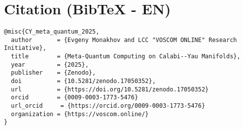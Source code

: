 \documentclass[12pt,a4paper]{article}
\begin{document}
\section*{Citation (BibTeX - EN)}
\begin{verbatim}
@misc{CY_meta_quantum_2025,
  author       = {Evgeny Monakhov and LCC "VOSCOM ONLINE" Research Initiative},
  title        = {Meta-Quantum Computing on Calabi--Yau Manifolds},
  year         = {2025},
  publisher    = {Zenodo},
  doi          = {10.5281/zenodo.17050352},
  url          = {https://doi.org/10.5281/zenodo.17050352}
  orcid		   = {0009-0003-1773-5476}
  url_orcid     = {https://orcid.org/0009-0003-1773-5476}
  organization = {https://voscom.online/}
}
\end{verbatim}
\end{document}
